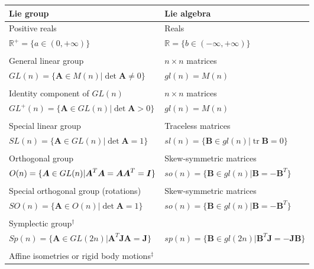 \documentclass[12pt]{article}
\newcommand{\mbs}[1]{\boldsymbol{#1}}
\newcommand{\mbb}[1]{\mathbb{#1}}
\def\bA{{\mbs{A}}} \def\bB{{\mbs{B}}} \def\bC{{\mbs{C}}}
\def\bJ{{\mbs{J}}} \def\bK{{\mbs{K}}} \def\bL{{\mbs{L}}}
\DeclareMathOperator{\tr}{tr}
\begin{document}
\begin{table}[htbp]
  \begin{center}
    \begin{tabular}{ l l }
      \toprule
      Lie group
      &
      Lie algebra
      \\
      \hline
      Positive reals
      &
      Reals
      \\
      $\mbb{R}^+ = \{ a \in (0,+\infty) \}$
      &
      $\mbb{R} = \{ b \in (-\infty, +\infty) \}$
      \\
      \\
      General linear group
      &
      $n\times n$ matrices
      \\
      $GL(n)=\{\bA\in M(n) | \det \bA \neq 0\}$
      &
      $gl(n)=M(n)$
      \\
      \\
      Identity component of $GL(n)$
      &
      $n\times n$ matrices
      \\
      $GL^+(n)=\{\bA\in GL(n) | \det \bA > 0\}$
      &
      $gl(n)=M(n)$
      \\
      \\
      Special linear group
      &
      Traceless matrices
      \\
      $SL(n)=\{\bA\in GL(n) | \det \bA = 1\}$
      &
      $sl(n)=\{\bB\in gl(n) | \tr \bB = 0\}$
      \\
      \\
      Orthogonal group
      &
      Skew-symmetric matrices
      \\
      $O(n)=\{\bA\in GL(n) | \bA^T\bA = \bA\bA^T = \bI\}$
      &
      $so(n)=\{\bB\in gl(n) | \bB = -\bB^T\}$
      \\
      \\
      Special orthogonal group (rotations)
      &
      Skew-symmetric matrices
      \\
      $SO(n)=\{\bA\in O(n) | \det \bA=1\}$
      &
      $so(n)=\{\bB\in gl(n) | \bB = -\bB^T\}$
      \\
      \\
      Symplectic group$^\dagger$
      &
      
      \\
      $Sp(n)=\{\bA\in GL(2n) | \bA^T \bJ\bA = \bJ\}$
      &
      $sp(n)=\{\bB\in gl(2n) | \bB^T \bJ = -\bJ \bB\}$
      \\
      \\
      Affine isometries or rigid body motions$^\ddagger$
      &
      

\end{tabular}
\end{center}
\end{table}
\end{document}
